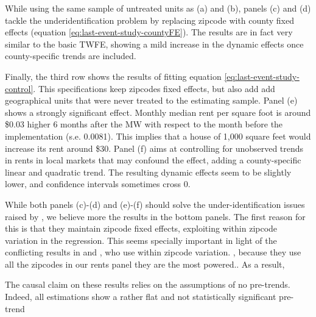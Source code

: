     While using the same sample of untreated units as (a) and (b), panels (c) and (d) tackle the underidentification problem by replacing zipcode with county fixed effects (equation \eqref{eq:last-event-study-countyFE}). The results are in fact very similar to the basic TWFE, showing a mild increase in the dynamic effects once county-specific trends are included. 
    
    Finally, the third row shows the results of fitting equation \eqref{eq:last-event-study-control}. This specifications keep zipcodes fixed effects, but also add add geographical units that were never treated to the estimating sample. Panel (e) shows a strongly significant effect. Monthly median rent per square foot is around \$0.03 higher 6 months after the MW with respect to the month before the implementation (s.e. 0.0081). This implies that a house of 1,000 square feet would increase its rent around \$30.
    Panel (f) aims at controlling for unobserved trends in rents in local markets that may confound the effect, adding a county-specific linear and quadratic trend. The resulting dynamic effects seem to be slightly lower, and confidence intervals sometimes cross 0. 
    
    While both panels (c)-(d) and (e)-(f) should solve the under-identification issues raised by \textcite{BorusyakJaravel2017}, we believe more the results in the bottom panels. The first reason for this is that they maintain zipcode fixed effects, exploiting within zipcode variation in the regression. This seems specially important in light of the conflicting results in \textcite{tidemann2018mw} and \textcite{yamagishi2019minimum}, who use within zipcode variation.
    , 
    because they use all the zipcodes in our rents panel they are the most powered.. As a result, 
    
    The causal claim on these results relies on the assumptions of no pre-trends. Indeed, all estimations show a rather flat and not statistically significant pre-trend %
    
